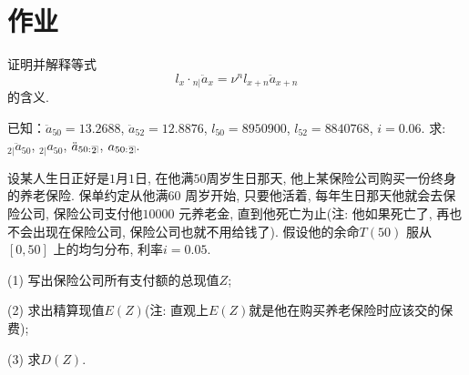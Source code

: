 \documentclass[a4paper,openany, 10pt]{ctexbook}
\makeatletter
\DeclareRobustCommand{\annu}[1]{_{%
    \def\arraystretch{0}%
    \setlength\arraycolsep{1pt}%
    \setlength\arrayrulewidth{.2pt}%
    \begin{array}[b]{@{}c|}\hline
        \\[\arraycolsep]%
        \scriptstyle #1%
    \end{array}%
}}
\makeatother
\begin{document}




\section{作业}
\begin{exs}
    证明并解释等式
    $$
        l_x \cdot {}_{n|}\ddot{a}_x = \nu^n l_{x+n} \ddot{a}_{x+n}
    $$
    的含义.
\end{exs}

\begin{exs}
    已知：$\ddot{a}_{50} = 13.2688$, $\ddot{a}_{52} = 12.8876$, $l_{50} = 8950900$, $l_{52} = 8840768$, $i = 0.06.$ 求: ${}_{2|}\ddot{a}_{50}$, ${}_{2|}a_{50}$, $\ddot{a}_{50:}{}\annu{2}$, $a_{50:}{}\annu{2}$.
\end{exs}


\begin{exs}
    设某人生日正好是$1$月$1$日, 在他满$50$周岁生日那天, 他上某保险公司购买一份终身的养老保险. 保单约定从他满$60$ 周岁开始, 只要他活着, 每年生日那天他就会去保险公司, 保险公司支付他$10000$ 元养老金, 直到他死亡为止(注: 他如果死亡了, 再也不会出现在保险公司, 保险公司也就不用给钱了). 假设他的余命$T(50)$ 服从$[0,50]$ 上的均匀分布, 利率$i=0.05.$

    (1) 写出保险公司所有支付额的总现值$Z$;

    (2) 求出精算现值$E(Z)$(注: 直观上$E(Z)$就是他在购买养老保险时应该交的保费);

    (3) 求$D(Z).$
\end{exs}
\end{document}
